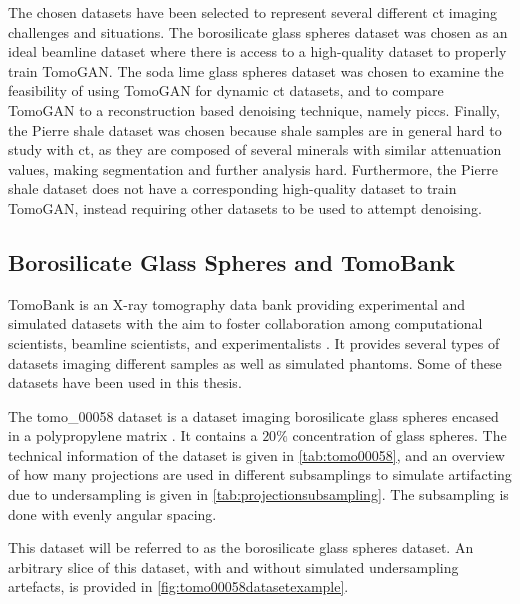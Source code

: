 The chosen datasets have been selected to represent several different \gls{ct} imaging challenges and situations. The borosilicate glass spheres dataset was chosen as an ideal beamline dataset where there is access to a high-quality dataset to properly train TomoGAN. The soda lime glass spheres dataset was chosen to examine the feasibility of using TomoGAN for dynamic \gls{ct} datasets, and to compare TomoGAN to a reconstruction based denoising technique, namely \gls{piccs}. Finally, the Pierre shale dataset was chosen because shale samples are in general hard to study with \gls{ct}, as they are composed of several minerals with similar attenuation values, making segmentation and further analysis hard. Furthermore, the Pierre shale dataset does not have a corresponding high-quality dataset to train TomoGAN, instead requiring other datasets to be used to attempt denoising. 

\subsection{Borosilicate Glass Spheres and TomoBank}
\label{sec:method:datasets:tomo00058}
TomoBank is an X-ray tomography data bank providing experimental and simulated datasets with the aim to foster collaboration among computational scientists, beamline scientists, and experimentalists \cite{TomoBank}. It provides several types of datasets imaging different samples as well as simulated phantoms. Some of these datasets have been used in this thesis.

The tomo\_00058 dataset is a dataset imaging borosilicate glass spheres encased in a polypropylene matrix \cite{datasetglassspheres}. It contains a $20\%$ concentration of glass spheres. The technical information of the dataset is given in \cref{tab:tomo00058}, and an overview of how many projections are used in different subsamplings to simulate artifacting due to undersampling is given in \cref{tab:projectionsubsampling}. The subsampling is done with evenly angular spacing. 

This dataset will be referred to as the borosilicate glass spheres dataset. An arbitrary slice of this dataset, with and without simulated undersampling artefacts, is provided in \cref{fig:tomo00058datasetexample}. 

